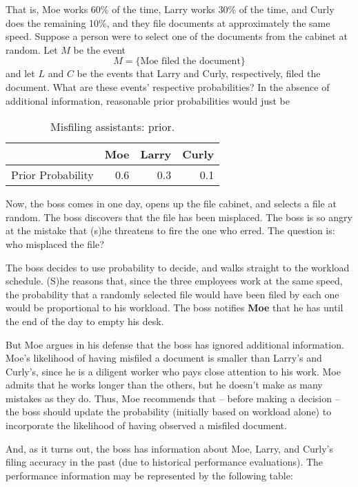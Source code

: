 That is, Moe works 60\% of the time, Larry works 30\% of the time, and
Curly does the remaining 10\%, and they file documents at approximately
the same speed. Suppose a person were to select one of the documents
from the cabinet at random. Let \(M\) be the event \[ M= \{ \mbox{Moe
filed the document} \} \] and let \(L\) and \(C\) be the events that
Larry and Curly, respectively, filed the document. What are these
events' respective probabilities? In the absence of additional
information, reasonable prior probabilities would just be

\begin{table}[htb]
\caption[Misfiling assistants: prior]{Misfiling assistants: prior.}
\centering
\begin{tabular}{lrrr}
 & Moe & Larry & Curly\\
\hline
Prior Probability & 0.6 & 0.3 & 0.1\\
\end{tabular}
\end{table}

Now, the boss comes in one day, opens up the file cabinet, and selects
a file at random. The boss discovers that the file has been
misplaced. The boss is so angry at the mistake that (s)he threatens to
fire the one who erred. The question is: who misplaced the file?

The boss decides to use probability to decide, and walks straight to
the workload schedule. (S)he reasons that, since the three employees
work at the same speed, the probability that a randomly selected file
would have been filed by each one would be proportional to his
workload. The boss notifies \textbf{Moe} that he has until the end of the day
to empty his desk.

But Moe argues in his defense that the boss has ignored additional
information. Moe's likelihood of having misfiled a document is smaller
than Larry's and Curly's, since he is a diligent worker who pays close
attention to his work. Moe admits that he works longer than the
others, but he doesn't make as many mistakes as they do. Thus, Moe
recommends that -- before making a decision -- the boss should update
the probability (initially based on workload alone) to incorporate the
likelihood of having observed a misfiled document.

And, as it turns out, the boss has information about Moe, Larry, and
Curly's filing accuracy in the past (due to historical performance
evaluations). The performance information may be represented by the
following table:

